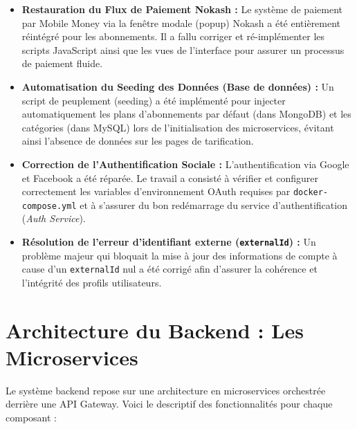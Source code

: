 \documentclass[12pt,a4paper]{article}
\begin{document}
\begin{itemize}
    \item \textbf{Restauration du Flux de Paiement Nokash :} Le système de paiement par Mobile Money via la fenêtre modale (popup) Nokash a été entièrement réintégré pour les abonnements. Il a fallu corriger et ré-implémenter les scripts JavaScript ainsi que les vues de l'interface pour assurer un processus de paiement fluide.
    \item \textbf{Automatisation du Seeding des Données (Base de données) :} Un script de peuplement (seeding) a été implémenté pour injecter automatiquement les plans d'abonnements par défaut (dans MongoDB) et les catégories (dans MySQL) lors de l'initialisation des microservices, évitant ainsi l'absence de données sur les pages de tarification.
    \item \textbf{Correction de l'Authentification Sociale :} L'authentification via Google et Facebook a été réparée. Le travail a consisté à vérifier et configurer correctement les variables d'environnement OAuth requises par \texttt{docker-compose.yml} et à s'assurer du bon redémarrage du service d'authentification (\textit{Auth Service}).
    \item \textbf{Résolution de l'erreur d'identifiant externe (\texttt{externalId}) :} Un problème majeur qui bloquait la mise à jour des informations de compte à cause d'un \texttt{externalId} nul a été corrigé afin d'assurer la cohérence et l'intégrité des profils utilisateurs.
\end{itemize}

\section{Architecture du Backend : Les Microservices}
Le système backend repose sur une architecture en microservices orchestrée derrière une API Gateway. Voici le descriptif des fonctionnalités pour chaque composant :
\end{document}

